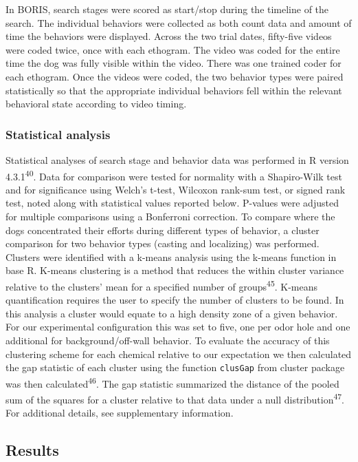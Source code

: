 \documentclass[
]{article}
\begin{document}
In BORIS, search stages were scored as start/stop during the timeline of the search. The individual behaviors were collected as both count data and amount of time the behaviors were displayed. Across the two trial dates, fifty-five videos were coded twice, once with each ethogram. The video was coded for the entire time the dog was fully visible within the video. There was one trained coder for each ethogram. Once the videos were coded, the two behavior types were paired statistically so that the appropriate individual behaviors fell within the relevant behavioral state according to video timing.

\hypertarget{statistical-analysis}{%
\subsubsection{Statistical analysis}\label{statistical-analysis}}

Statistical analyses of search stage and behavior data was performed in R version 4.3.1\textsuperscript{40}. Data for comparison were tested for normality with a Shapiro-Wilk test and for significance using Welch's t-test, Wilcoxon rank-sum test, or signed rank test, noted along with statistical values reported below. P-values were adjusted for multiple comparisons using a Bonferroni correction. To compare where the dogs concentrated their efforts during different types of behavior, a cluster comparison for two behavior types (casting and localizing) was performed. Clusters were identified with a k-means analysis using the k-means function in base R. K-means clustering is a method that reduces the within cluster variance relative to the clusters' mean for a specified number of groups\textsuperscript{45}. K-means quantification requires the user to specify the number of clusters to be found. In this analysis a cluster would equate to a high density zone of a given behavior. For our experimental configuration this was set to five, one per odor hole and one additional for background/off-wall behavior. To evaluate the accuracy of this clustering scheme for each chemical relative to our expectation we then calculated the gap statistic of each cluster using the function \texttt{clusGap} from cluster package was then calculated\textsuperscript{46}. The gap statistic summarized the distance of the pooled sum of the squares for a cluster relative to that data under a null distribution\textsuperscript{47}. For additional details, see supplementary information.

\hypertarget{results}{%
\subsection{Results}\label{results}}
\end{document}
